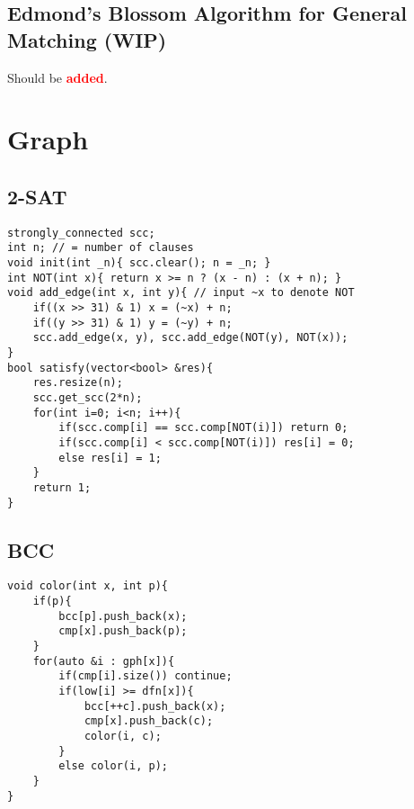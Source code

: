 \documentclass[landscape, 10pt, a4paper, oneside,  twocolumn]{article}
\newcommand{\added}{Should be \textcolor{red}{\textbf{added}}.}
\begin{document}
\subsection {Edmond's Blossom Algorithm for General Matching (WIP)}
\added


\section{Graph}
\subsection {2-SAT}
\begin{verbatim}
strongly_connected scc;
int n; // = number of clauses
void init(int _n){ scc.clear(); n = _n; }  
int NOT(int x){ return x >= n ? (x - n) : (x + n); }
void add_edge(int x, int y){ // input ~x to denote NOT
	if((x >> 31) & 1) x = (~x) + n;
	if((y >> 31) & 1) y = (~y) + n;
	scc.add_edge(x, y), scc.add_edge(NOT(y), NOT(x));
}
bool satisfy(vector<bool> &res){
	res.resize(n);
	scc.get_scc(2*n);  
	for(int i=0; i<n; i++){
		if(scc.comp[i] == scc.comp[NOT(i)]) return 0;
		if(scc.comp[i] < scc.comp[NOT(i)]) res[i] = 0;
		else res[i] = 1;
	}
	return 1;
}
\end{verbatim}
\subsection {BCC}
\begin{verbatim}
void color(int x, int p){
	if(p){
		bcc[p].push_back(x);
		cmp[x].push_back(p);
	}
	for(auto &i : gph[x]){
		if(cmp[i].size()) continue;
		if(low[i] >= dfn[x]){
			bcc[++c].push_back(x);
			cmp[x].push_back(c);
			color(i, c);
		}
		else color(i, p);
	}
}
\end{verbatim}
\end{document}
